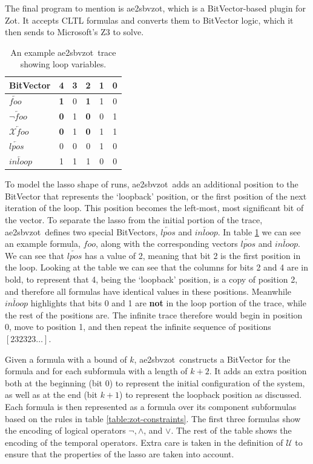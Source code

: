 \documentclass[a4paper,12pt]{article}
\newcommand{\aez}{ae2sbvzot}
\begin{document}
The final program to mention is \aez, which is a BitVector-based plugin for Zot.
It accepts CLTL formulas and converts them to BitVector logic, which it then
sends to Microsoft's Z3 to solve.

\begin{table}
  \centering
  \caption{An example \aez\ trace showing loop variables.}
  \begin{tabular}{l|c c c c c}
    BitVector & \textbf{4} & 3 & \textbf{2} & 1 & 0 \\
    \midrule
    \(\overleftarrow{foo}\)            & \textbf{1} & 0 & \textbf{1} & 1 & 0 \\
    \(\overleftarrow{\neg foo}\)       & \textbf{0} & 1 & \textbf{0} & 0 & 1 \\
    \(\overleftarrow{\mathcal{X}foo}\) & \textbf{0} & 1 & \textbf{0} & 1 & 1 \\

    \midrule
    \(\overleftarrow{lpos}\)           & 0 & 0 & 0 & 1 & 0 \\
    \(\overleftarrow{inloop}\)         & 1 & 1 & 1 & 0 & 0

  \end{tabular}
  \label{table:zotloop}
 \end{table}

To model the lasso shape of runs, \aez\ adds an additional position to the
BitVector that represents the `loopback' position, or the first position of the
next iteration of the loop. This position becomes the left-most, most
significant bit of the vector. To separate the lasso from the initial portion of
the trace, \aez\ defines two special BitVectors, \(\overleftarrow{lpos}\) and
\(\overleftarrow{inloop}\). In table \ref{table:zotloop} we can see an example formula,
\(foo\), along with the corresponding vectors \(\overleftarrow{lpos}\) and
\(\overleftarrow{inloop}\). We can see that \(\overleftarrow{lpos}\) has a value
of 2, meaning that bit 2 is the first position in the loop. Looking at the table
we can see that the columns for bits 2 and 4 are in bold, to represent that 4,
being the `loopback' position, is a copy of position 2, and therefore all
formulas have identical values in these positions. Meanwhile
\(\overleftarrow{inloop}\) highlights that bits 0 and 1 are \textbf{not} in the
loop portion of the trace, while the rest of the positions are. The infinite
trace therefore would begin in position 0, move to position 1, and then repeat
the infinite sequence of positions \([232323\ldots]\).

Given a formula with a bound of \(k\), \aez\ constructs a BitVector for the
formula and for each subformula with a length of \(k{+}2\). It adds an extra
position both at the beginning (bit 0) to represent the initial configuration of
the system, as well as at the end (bit \(k{+}1\)) to represent the loopback
position as discussed. Each formula is then represented as a formula over its
component subformulas based on the rules in table \ref{table:zot-constraints}.
The first three formulas show the encoding of logical operators \(\neg, \land\),
and \(\lor\). The rest of the table shows the encoding of the temporal
operators. Extra care is taken in the definition of \(\mathcal{U}\) to ensure
that the properties of the lasso are taken into account.
\end{document}
